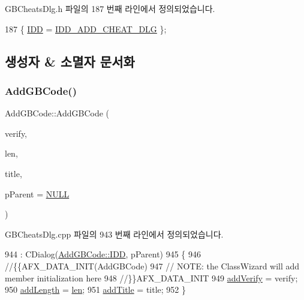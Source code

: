 G\+B\+Cheats\+Dlg.\+h 파일의 187 번째 라인에서 정의되었습니다.


\begin{DoxyCode}
187 \{ \mbox{\hyperlink{class_add_g_b_code_a2dd2d84fa89620e9d1bd9816ac698df9a796ce5251d56e030eaec4941c10b6a17}{IDD}} = \mbox{\hyperlink{resource_8h_a388a8d7b6dea32798ece69044a21790d}{IDD\_ADD\_CHEAT\_DLG}} \};
\end{DoxyCode}


\subsection{생성자 \& 소멸자 문서화}
\mbox{\label{class_add_g_b_code_a99be74c9c22f954a6a83fb1e8eba7b29}} 
\subsubsection{\texorpdfstring{Add\+G\+B\+Code()}{AddGBCode()}}
{\footnotesize\ttfamily Add\+G\+B\+Code\+::\+Add\+G\+B\+Code (\begin{DoxyParamCaption}\item[{bool($\ast$)(\mbox{\hyperlink{getopt1_8c_a2c212835823e3c54a8ab6d95c652660e}{const}} char $\ast$, \mbox{\hyperlink{getopt1_8c_a2c212835823e3c54a8ab6d95c652660e}{const}} char $\ast$)}]{verify,  }\item[{\mbox{\hyperlink{_util_8cpp_a0ef32aa8672df19503a49fab2d0c8071}{int}}}]{len,  }\item[{\mbox{\hyperlink{getopt1_8c_a2c212835823e3c54a8ab6d95c652660e}{const}} char $\ast$}]{title,  }\item[{C\+Wnd $\ast$}]{p\+Parent = {\ttfamily \mbox{\hyperlink{_system_8h_a070d2ce7b6bb7e5c05602aa8c308d0c4}{N\+U\+LL}}} }\end{DoxyParamCaption})}



G\+B\+Cheats\+Dlg.\+cpp 파일의 943 번째 라인에서 정의되었습니다.


\begin{DoxyCode}
944   : CDialog(\mbox{\hyperlink{class_add_g_b_code_a2dd2d84fa89620e9d1bd9816ac698df9a796ce5251d56e030eaec4941c10b6a17}{AddGBCode::IDD}}, pParent)
945 \{
946   \textcolor{comment}{//\{\{AFX\_DATA\_INIT(AddGBCode)}
947   \textcolor{comment}{// NOTE: the ClassWizard will add member initialization here}
948   \textcolor{comment}{//\}\}AFX\_DATA\_INIT}
949   \mbox{\hyperlink{class_add_g_b_code_a3c81ddb0e728491632442e95218f40cf}{addVerify}} = verify;
950   \mbox{\hyperlink{class_add_g_b_code_abed904b4077498637455cbd6f829a742}{addLength}} = \mbox{\hyperlink{expr-lex_8cpp_afed088663f8704004425cdae2120b9b3}{len}};
951   \mbox{\hyperlink{class_add_g_b_code_a436954b9aea5bac8b7063a6939f829ae}{addTitle}} = title;
952 \}
\end{DoxyCode}


